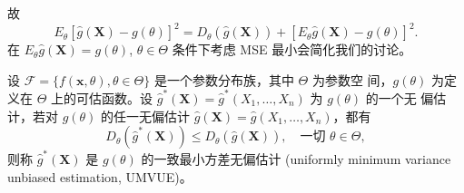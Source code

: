 故
$$E_\theta[\hat{g}(\mathbf{X}) - g(\theta)]^2 = D_\theta(\hat{g}(\mathbf{X})) + [E_\theta \hat{g}(\mathbf{X}) - g(\theta)]^2.$$
在 $E_\theta \hat{g}(\mathbf{X}) = g(\theta)$, $\theta \in \Theta$ 条件下考虑 MSE 最小会简化我们的讨论。

\begin{definition}\label{def:UMVUE}
设 $\mathcal{F} = \{f(\mathbf{x}, \theta), \theta \in \Theta\}$ 是一个参数分布族，其中 $\Theta$ 为参数空
间，$g(\theta)$ 为定义在 $\Theta$ 上的可估函数。设 $\hat{g}^*(\mathbf{X}) = \hat{g}^*(X_1, \dots, X_n)$ 为 $g(\theta)$ 的一个无
偏估计，若对 $g(\theta)$ 的任一无偏估计 $\hat{g}(\mathbf{X}) = \hat{g}(X_1, \dots, X_n)$，都有
\begin{equation}
D_\theta(\hat{g}^*(\mathbf{X})) \leq D_\theta(\hat{g}(\mathbf{X})), \quad \text{一切 } \theta \in \Theta, \label{eq:UMVUE_condition}
\end{equation}
则称 $\hat{g}^*(\mathbf{X})$ 是 $g(\theta)$ 的一致最小方差无偏估计 (uniformly minimum variance unbiased
estimation, UMVUE)。
\end{definition}

